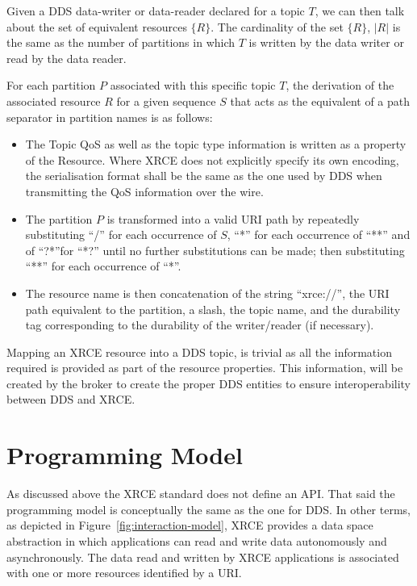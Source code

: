 \documentclass[a4paper,oneside,article]{memoir}
\begin{document}
Given a DDS data-writer or data-reader declared for a topic $T$, we can then talk about the set of
equivalent resources $\{ R \}$. The cardinality of the set $\{ R \}$, $|R|$ is the same as the
number of partitions in which $T$ is written by the data writer or read by the data reader.

For each partition $P$ associated with this specific topic $T$, the derivation of the associated
resource $R$ for a given sequence $S$ that acts as the equivalent of a path separator in partition
names is as follows:
\begin{itemize}
\item The Topic QoS as well as the topic type information is written as a property of the Resource.
  Where XRCE does not explicitly specify its own encoding, the serialisation format shall be the
  same as the one used by DDS when transmitting the QoS information over the wire.
\item The partition $P$ is transformed into a valid URI path by repeatedly substituting ``/'' for
  each occurrence of $S$, ``*'' for each occurrence of ``**'' and of ``?*''for ``*?'' until no
  further substitutions can be made; then substituting ``**'' for each occurrence of ``*''.
\item The resource name is then concatenation of the string ``xrce://'', the URI path equivalent to
  the partition, a slash, the topic name, and the durability tag corresponding to the durability of
  the writer/reader (if necessary).
\end{itemize}
Mapping an XRCE resource into a DDS topic, is trivial as all the information required is provided as
part of the resource properties.  This information, will be created by the broker to create the
proper DDS entities to ensure interoperability between DDS and XRCE.

\section{Programming Model}

As discussed above the XRCE standard does not define an API\@.  That said the programming model is
conceptually the same as the one for DDS\@.  In other terms, as depicted in
Figure~\ref{fig:interaction-model}, XRCE provides a data space abstraction in which applications can
read and write data autonomously and asynchronously.  The data read and written by XRCE applications
is associated with one or more resources identified by a URI\@.
\end{document}
